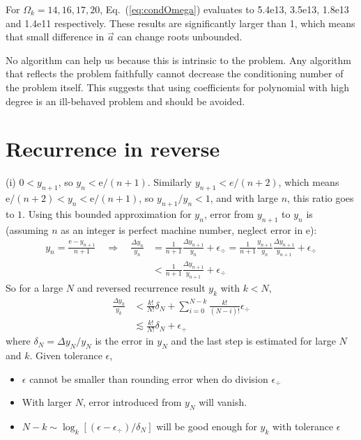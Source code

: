 \documentclass[11pt]{article}
\numberwithin{equation}{section} %
\newcommand\e{\mathrm{e}}
\begin{document}
For $\Omega_k = 14, 16, 17, 20$, Eq.~(\ref{eq:condOmega}) evaluates to
5.4e13, 3.5e13, 1.8e13 and 1.4e11 respectively. These results are
significantly larger than 1, which means that small difference in $\vec a$ 
can change roots unbounded. 

No algorithm can help us because this is intrinsic to the problem. Any
algorithm that reflects the problem faithfully cannot decrease the
conditioning number of the problem itself. 
This suggests that using coefficients for polynomial with high degree 
is an ill-behaved problem and should be avoided. 

\section{Recurrence in reverse}
(i) $0 < y_{n+1} $, so $y_n < \e/(n+1)$.
Similarly $y_{n+1} < e/(n+2)$, which means $\e/(n+2) < y_n < \e/(n+1)$, 
so $y_{n+1}/y_n < 1$, and with large $n$, this ratio goes to $1$. 
Using this bounded approximation for $y_n$, 
error from $y_{n+1}$ to $y_n$ is (assuming $n$ as an integer is perfect
machine number, neglect error in $\e$): 
\begin{align}
  y_n = \frac{\e - y_{n+1}}{n+1}
  \quad\Rightarrow\quad
  \frac{\Delta y_n}{y_n} 
  &= \frac{1}{n+1}\frac{\Delta y_{n+1}}{y_n} + \epsilon_\div 
  = \frac{1}{n+1} \frac{y_{n+1}}{y_n} \frac{\Delta y_{n+1}}{y_{n+1}}
  + \epsilon_\div \\
  &< \frac{1}{n+1}\frac{\Delta y_{n+1}}{y_{n+1}} + \epsilon_\div 
\end{align}
So for a large $N$ and reversed recurrence result $y_k$ with $k<N$, 
\begin{align}
  \frac{\Delta y_k}{y_k} 
  &<
  \frac{k!}{N!}\delta_N + \sum_{i=0}^{N-k} \frac{k!}{(N-i)!} \epsilon_\div \\
  &\lesssim \frac{k!}{N!}\delta_N + \epsilon_\div
  \label{eq:deltay}
\end{align}
where $\delta_N = \Delta y_N / y_N$
is the error in $y_N$ and the last step is estimated for 
large $N$ and $k$. Given tolerance $\epsilon$, 
\begin{itemize}
  \item $\epsilon$ cannot be smaller than rounding error when do division 
    $\epsilon_\div$
  \item With larger $N$, error introduced from $y_N$ will vanish. 
  \item $N-k\sim \log_k[(\epsilon - \epsilon_\div)/\delta_N]$
    will be good enough for $y_k$ with tolerance $\epsilon$
\end{itemize}
\end{document}

